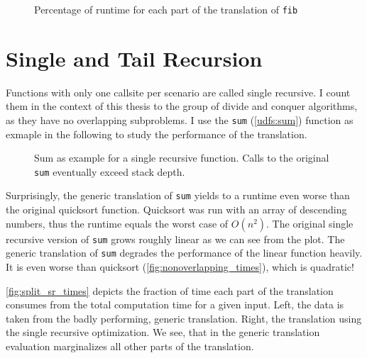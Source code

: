 \begin{figure}[h!]
    \centering\small
    
    \caption{Percentage of runtime for each part of the translation of \texttt{fib}}
    \label{fig:split_times}
\end{figure}


\iffalse
\begin{figure}[h]
    \centering\small
    
    \caption{Impact of the number of scenarios on the runtime. Single recursive function with expensive predicates}
    \label{fig:recn_times}
\end{figure}

Impact of number of scenarios (Overhead by predicates) \autoref{fig:recn_times}

\fi




\section{Single and Tail Recursion}

Functions with only one callsite per scenario are called single recursive. I count them in the context of this thesis to the group of divide and conquer algorithms, as they have no overlapping subproblems. I use the \texttt{sum} (\autoref{udfs:sum}) function as exmaple in the following to study the performance of the translation.

\begin{figure}[h!]
    \centering\small
    
    \caption{Sum as example for a single recursive function. Calls to the original \texttt{sum} eventually exceed stack depth.}
    \label{fig:factorial_times}
\end{figure}


Surprisingly, the generic translation of \texttt{sum} yields to a runtime even worse than the original quicksort function. Quicksort was run with an array of descending numbers, thus the runtime equals the worst case of $O(n^2)$. The original single recursive version of \texttt{sum} grows roughly linear as we can see from the plot. The generic translation of \texttt{sum} degrades the performance of the linear function heavily. It is even worse than quicksort (\autoref{fig:nonoverlapping_times}), which is quadratic!

\autoref{fig:split_sr_times} depicts the fraction of time each part of the translation consumes from the total computation time for a given input. Left, the data is taken from the badly performing, generic translation. Right, the translation using the single recursive optimization. We see, that in the generic translation evaluation marginalizes all other parts of the translation.

